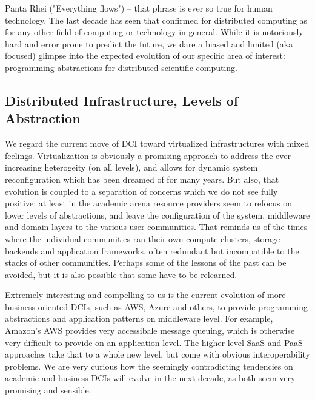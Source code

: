 \documentclass[]{article}
\newcommand{\B}[1]{\textbf{#1}}
\newcommand{\todo}[1]{{\textcolor{red}{\B{TODO:} #1 }}}
\begin{document}
 Panta Rhei ("Everything flows") -- that phrase is ever so true for
 human technology.  The last decade has seen that confirmed for
 distributed computing as for any other field of computing or
 technology in general.  While it is notoriously hard and error prone
 to predict the future, we dare a biased and limited (aka focused)
 glimpse into the expected evolution of our specific area of interest:
 programming abstractions for distributed scientific computing. 


\subsection{Distributed Infrastructure, Levels of Abstraction} 


 We regard the current move of DCI toward virtualized infrastructures
 with mixed feelings.  Virtualization is obviously a promising
 approach to address the ever increasing heterogeity (on all levels),
 and allows for dynamic system reconfiguration which has been dreamed
 of for many years.  But also, that evolution is coupled to a
 separation of concerns which we do not see fully positive: at least
 in the academic arena resource providers seem to refocus on lower
 levels of abstractions, and leave the configuration of the system,
 middleware and domain layers to the various user communities.  That
 reminds us of the times where the individual communities ran their
 own compute clusters, storage backends and application frameworks,
 often redundant but incompatible to the stacks of other communities.
 Perhaps some of the lessons of the past can be avoided, but it is
 also possible that some have to be relearned.

 Extremely interesting and compelling to us is the current evolution
 of more business oriented DCIs,  such as AWS, Azure and others, to
 provide programming abstractions and application patterns on
 middleware level.  For example, Amazon's AWS provides very
 accessibale message queuing, which is otherwise very difficult to
 provide on an application level.  The higher level SaaS and PaaS
 approaches take that to a whole new level, but come with obvious
 interoperability problems.  We are very curious how the seemingly
 contradicting tendencies on academic and business DCIs will evolve in
 the next decade, as both seem very promising and sensible.


\end{document}

